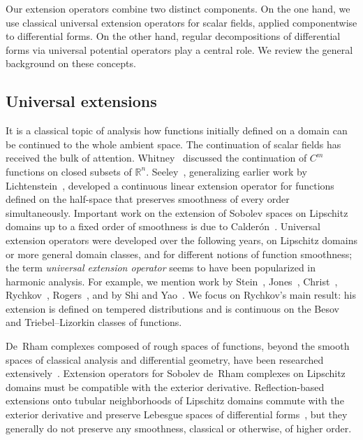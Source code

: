 \documentclass[10pt,a4paper]{amsart}
\theoremstyle{definition}
\theoremstyle{remark}
\numberwithin{equation}{section}
\newcommand{\bbR}{{\mathbb R}}
\begin{document}
Our extension operators combine two distinct components.
On the one hand, we use classical universal extension operators for scalar fields, applied componentwise to differential forms. 
On the other hand, regular decompositions of differential forms via universal potential operators play a central role.
We review the general background on these concepts.



\subsection{Universal extensions} 



It is a classical topic of analysis how functions initially defined on a domain can be continued to the whole ambient space. 
The continuation of scalar fields has received the bulk of attention. 
Whitney~\cite{whitney1934analytic} discussed the continuation of $C^{m}$ functions on closed subsets of $\bbR^{n}$. 
Seeley~\cite{seeley1964extension}, generalizing earlier work by Lichtenstein~\cite{lichtenstein1929elementare}, developed a continuous linear extension operator for functions defined on the half-space that preserves smoothness of every order simultaneously. 
Important work on the extension of Sobolev spaces on Lipschitz domains up to a fixed order of smoothness is due to Calder\'on~\cite{calderon1961lebesgue}. 
Universal extension operators were developed over the following years,  
on Lipschitz domains or more general domain classes, and for different notions of function smoothness;
the term \emph{universal extension operator} seems to have been popularized in harmonic analysis.
For example, we mention work by Stein~\cite{stein1970singular}, Jones~\cite{jones1981quasiconformal}, Christ~\cite{christ1984extension}, Rychkov~\cite{rychkov1999restrictions}, Rogers~\cite{rogers2006degree}, and by Shi and Yao~\cite{shi2024estimates}.
We focus on Rychkov's main result: his extension is defined on tempered distributions and is continuous on the Besov and Triebel--Lizorkin classes of functions. 



De~Rham complexes composed of rough spaces of functions, beyond the smooth spaces of classical analysis and differential geometry, 
have been researched extensively~\cite{federer,derham1984differentiable,goldshtein1982differential,scott1995Lp,iwaniec1999nonlinear,mitrea2008traces,goldshtein2011hodge}. 
Extension operators for Sobolev de~Rham complexes on Lipschitz domains must be compatible with the exterior derivative. 
Reflection-based extensions onto tubular neighborhoods of Lipschitz domains commute with the exterior derivative and preserve Lebesgue spaces of differential forms~\cite{schoeberl2008posteriori,AFW1,licht2019smoothed,licht2019mixed,hiptmair2020review},
but they generally do not preserve any smoothness, classical or otherwise, of higher order. 
\end{document}
